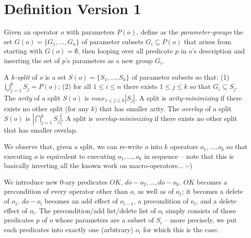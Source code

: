 

\section{Definition Version 1}
\label{definition-v1}




Given an operator $o$ with parameters $P(o)$, define as the
\emph{parameter-groups} the set $G(o) = \{G_1, \dots, G_n\}$ of
parameter subsets $G_i \subseteq P(o)$ that arises from starting with
$G(o) = \emptyset$, then looping over all predicate $p$ in $o$'s
description and inserting the set of $p$'s parameters as a new group
$G_i$.


A \emph{$k$-split} of $o$ is a set $S(o) = \{S_1, \dots, S_k\}$ of
parameter subsets so that: (1) $\bigcup_{j=1}^k S_j = P(o)$; (2) for
all $1 \leq i \leq n$ there exists $1 \leq j \leq k$ so that $G_i
\subseteq S_j$. The \emph{arity} of a split $S(o)$ is $max_{1\leq j
  \leq k} |S_j|$. A split is \emph{arity-minimizing} if there exists
no other split (for any $k$) that has smaller arity. The
\emph{overlap} of a split $S(o)$ is $|\bigcap_{j=1}^k S_j|$. A split
is \emph{overlap-minimizing} if there exists no other split that has
smaller overlap.


We observe that, given a split, we can re-write $o$ into $k$ operators
$o_1, \dots, o_k$ so that executing $o$ is equivalent to executing
$o_1, \dots, o_k$ in sequence -- note that this is basically inverting
all the known work on macro-operators... :-)


We introduce new $0$-ary predicates $OK$, $do-o_2, \dots,
do-o_k$. $OK$ becomes a precondition of every operator other than $o$,
as well as of $o_1$; it becomes a delete of $o_1$. $do-o_i$ becomes an
add effect of $o_{i-1}$, a precondition of $o_i$, and a delete effect
of $o_i$. The precondition/add list/delete list of $o_i$ simply
consists of those predicates $p$ of $o$ whose parameters are a subset
of $S_i$ -- more precisely, we put each predicates into exactly one
(arbitrary) $o_i$ for which this is the case. 


